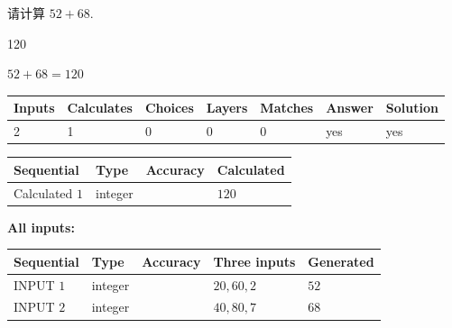 \documentclass{ctexart}
\begin{document}
  
 
请计算 $ %
52 +  %
68 $.
 
 
 
\noindent{}
 
 

120
 
 
\noindent{}
 
 

 
 
 
\noindent{}
 
 

$ %
52 +  %
68=   %
120$
 
 
\noindent{}
 
 

 
   
   
   
   
\noindent\begin{tabular}{|l|l|l|l|l|l|l|}
 \hline
Inputs & Calculates & Choices & Layers & Matches & Answer & Solution \\ \hline
 2  & 
 1  & 
 0
  & 
 0  & 
 0  & 
  yes & 
  yes 
  \\ \hline
 \end{tabular}
   
   
   
   
\noindent{}
   
   
  
  
\noindent\begin{tabular}{|l|l|l|l|}
\hline
 Sequential & Type & Accuracy & Calculated \\ 
\hline
 
 
  Calculated $  1 $ & integer &  & 
  $ 120 $ 
 \\  \hline  
 \end{tabular}
   
   
   
   
\noindent\vspace{0.1in}\hspace{-0.08in} {\textbf{\Large{All inputs: }}}
   
   
  
  
\noindent\begin{tabular}{|l|l|l|l|l|}
\hline
 Sequential & Type & Accuracy & Three inputs & Generated \\ 
\hline
 
 
  INPUT $  1 $ & integer &  & $
 20
 , 
 60
 , 
 2
 $ & $ 52 $ 
 \\  \hline  
 
 
  INPUT $  2 $ & integer &  & $
 40
 , 
 80
 , 
 7
 $ & $ 68 $ 
 \\  \hline  
 \end{tabular}
   
\end{document}
